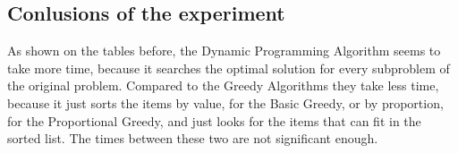\subsection*{Conlusions of the experiment}

As shown on the tables before, the Dynamic Programming Algorithm seems to take more time, because it searches the optimal
solution for every subproblem of the original problem. Compared to the Greedy Algorithms they take less time, because it
just sorts the items by value, for the Basic Greedy, or by proportion, for the Proportional Greedy, and just looks for the 
items that can fit in the sorted list. The times between these two are not significant enough.
